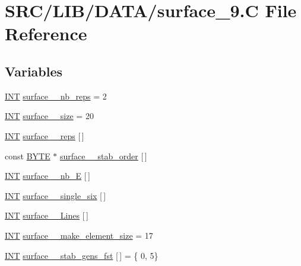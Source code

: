 \hypertarget{surface__9_8_c}{}\section{S\+R\+C/\+L\+I\+B/\+D\+A\+T\+A/surface\+\_\+9.C File Reference}
\label{surface__9_8_c}
\subsection*{Variables}
\begin{DoxyCompactItemize}
\item 
\mbox{\hyperlink{galois_8h_a09fddde158a3a20bd2dcadb609de11dc}{I\+NT}} \mbox{\hyperlink{surface__9_8_c_acca1257dab8b97592206c4a101b3ee15}{surface\+\_\+\_\+nb\+\_\+reps}} = 2
\item 
\mbox{\hyperlink{galois_8h_a09fddde158a3a20bd2dcadb609de11dc}{I\+NT}} \mbox{\hyperlink{surface__9_8_c_acb4084b307d17aea4c63d7479a293e1f}{surface\+\_\+\_\+size}} = 20
\item 
\mbox{\hyperlink{galois_8h_a09fddde158a3a20bd2dcadb609de11dc}{I\+NT}} \mbox{\hyperlink{surface__9_8_c_a3fa999b1c4d708b70d015d3434682feb}{surface\+\_\+\_\+reps}} \mbox{[}$\,$\mbox{]}
\item 
const \mbox{\hyperlink{galois_8h_ab6cc7b4aeb6ea31aba2b3fbfc83ff5e6}{B\+Y\+TE}} $\ast$ \mbox{\hyperlink{surface__9_8_c_a889a8d0b9ab6053d7f2c22b29777262f}{surface\+\_\+\_\+stab\+\_\+order}} \mbox{[}$\,$\mbox{]}
\item 
\mbox{\hyperlink{galois_8h_a09fddde158a3a20bd2dcadb609de11dc}{I\+NT}} \mbox{\hyperlink{surface__9_8_c_a6709da29692993e8cb8846d424b0c1c1}{surface\+\_\+\_\+nb\+\_\+E}} \mbox{[}$\,$\mbox{]}
\item 
\mbox{\hyperlink{galois_8h_a09fddde158a3a20bd2dcadb609de11dc}{I\+NT}} \mbox{\hyperlink{surface__9_8_c_ab73a0dcb7fe325509bb81c26efa2f0d3}{surface\+\_\+\_\+single\+\_\+six}} \mbox{[}$\,$\mbox{]}
\item 
\mbox{\hyperlink{galois_8h_a09fddde158a3a20bd2dcadb609de11dc}{I\+NT}} \mbox{\hyperlink{surface__9_8_c_a5d4cef4aecb6d548cb5fd4eb8c9309d4}{surface\+\_\+\_\+\+Lines}} \mbox{[}$\,$\mbox{]}
\item 
\mbox{\hyperlink{galois_8h_a09fddde158a3a20bd2dcadb609de11dc}{I\+NT}} \mbox{\hyperlink{surface__9_8_c_ad81a8479820b313fd10163e521792a83}{surface\+\_\+\_\+make\+\_\+element\+\_\+size}} = 17
\item 
\mbox{\hyperlink{galois_8h_a09fddde158a3a20bd2dcadb609de11dc}{I\+NT}} \mbox{\hyperlink{surface__9_8_c_af7aad653c4c81a79b4296680a0717b49}{surface\+\_\+\_\+stab\+\_\+gens\+\_\+fst}} \mbox{[}$\,$\mbox{]} = \{ 0, 5\}

\end{DoxyCompactItemize}
